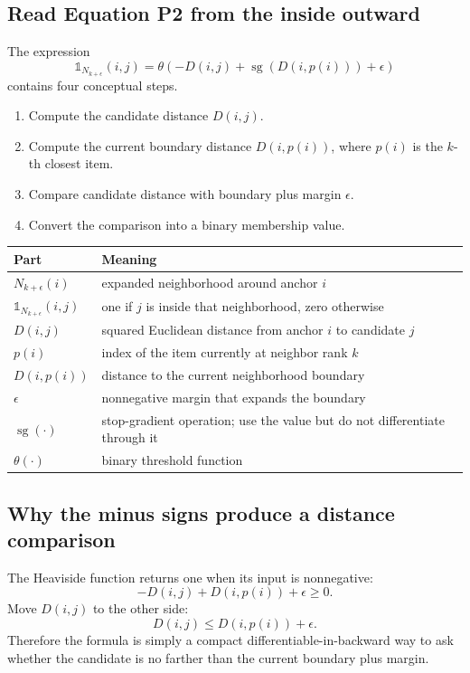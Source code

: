 \documentclass[11pt,oneside,openany]{book}
\theoremstyle{myplain}
\theoremstyle{definition}
\newcommand{\ind}{\mathds{1}}
\newcommand{\sg}{\operatorname{sg}}
\begin{document}
\subsection{Read Equation P2 from the inside outward}

The expression
\[
\ind_{N_{k+\epsilon}}(i,j)
=\theta\!\left(-D(i,j)+\sg(D(i,p(i)))+\epsilon\right)
\]
contains four conceptual steps.

\begin{enumerate}[leftmargin=*,itemsep=5pt]
  \item Compute the candidate distance $D(i,j)$.
  \item Compute the current boundary distance $D(i,p(i))$, where $p(i)$ is the $k$-th closest item.
  \item Compare candidate distance with boundary plus margin $\epsilon$.
  \item Convert the comparison into a binary membership value.
\end{enumerate}

\begin{center}
\begin{tabularx}{\textwidth}{>{\bfseries}l X}
\toprule
Part & Meaning \\
\midrule
$N_{k+\epsilon}(i)$ & expanded neighborhood around anchor $i$ \\
$\ind_{N_{k+\epsilon}}(i,j)$ & one if $j$ is inside that neighborhood, zero otherwise \\
$D(i,j)$ & squared Euclidean distance from anchor $i$ to candidate $j$ \\
$p(i)$ & index of the item currently at neighbor rank $k$ \\
$D(i,p(i))$ & distance to the current neighborhood boundary \\
$\epsilon$ & nonnegative margin that expands the boundary \\
$\sg(\cdot)$ & stop-gradient operation; use the value but do not differentiate through it \\
$\theta(\cdot)$ & binary threshold function \\
\bottomrule
\end{tabularx}
\end{center}

\subsection{Why the minus signs produce a distance comparison}

The Heaviside function returns one when its input is nonnegative:
\[
-D(i,j)+D(i,p(i))+\epsilon\ge 0.
\]
Move $D(i,j)$ to the other side:
\[
D(i,j)\le D(i,p(i))+\epsilon.
\]
Therefore the formula is simply a compact differentiable-in-backward way to ask whether the candidate is no farther than the current boundary plus margin.
\end{document}
